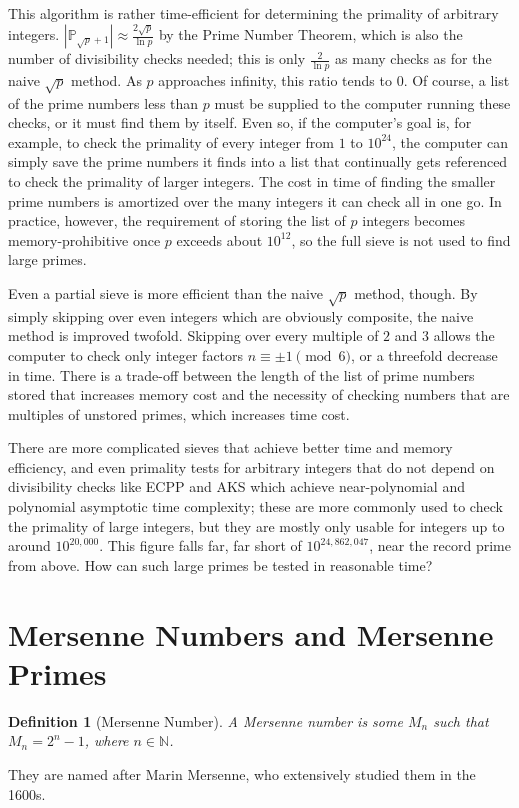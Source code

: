 \documentclass[10pt, oneside]{article}
\newcommand{\N}{\mathbb{N}}
\renewcommand{\P}{\mathbb{P}} %
\newtheorem{defn}{Definition}
\begin{document}
This algorithm is rather time-efficient for determining the primality of arbitrary integers. $|\P_{\sqrt{p} + 1}| \approx \frac{2\sqrt{p}}{\ln p}$ by the Prime Number Theorem, which is also the number of divisibility checks needed; this is only $\frac{2}{\ln p}$ as many checks as for the naive $\sqrt{p}$ method. As $p$ approaches infinity, this ratio tends to $0$. Of course, a list of the prime numbers less than $p$ must be supplied to the computer running these checks, or it must find them by itself. Even so, if the computer's goal is, for example, to check the primality of every integer from $1$ to $10^{24}$, the computer can simply save the prime numbers it finds into a list that continually gets referenced to check the primality of larger integers. The cost in time of finding the smaller prime numbers is amortized over the many integers it can check all in one go. In practice, however, the requirement of storing the list of $p$ integers becomes memory-prohibitive once $p$ exceeds about $10^{12}$, so the full sieve is not used to find large primes.

Even a partial sieve is more efficient than the naive $\sqrt{p}$ method, though. By simply skipping over even integers which are obviously composite, the naive method is improved twofold. Skipping over every multiple of $2$ and $3$ allows the computer to check only integer factors $n \equiv \pm1 \pmod 6$, or a threefold decrease in time. There is a trade-off between the length of the list of prime numbers stored that increases memory cost and the necessity of checking numbers that are multiples of unstored primes, which increases time cost.

There are more complicated sieves that achieve better time and memory efficiency, and even primality tests for arbitrary integers that do not depend on divisibility checks like ECPP \cite{ECPP} and AKS \cite{AKS} which achieve near-polynomial and polynomial asymptotic time complexity; these are more commonly used to check the primality of large integers, but they are mostly only usable for integers up to around $10^{20,000}$. This figure falls far, far short of $10^{24,862,047}$, near the record prime from above. How can such large primes be tested in reasonable time?


\section{Mersenne Numbers and Mersenne Primes}

\begin{defn}[Mersenne Number] 
A Mersenne number is some $M_n$ such that $M_n = 2^n  - 1$, where $n \in \N$. 
\end{defn}
They are named after Marin Mersenne, who extensively studied them in the 1600s.
\end{document}
